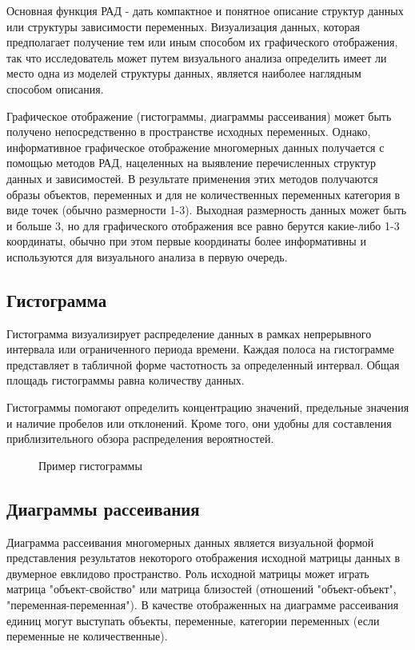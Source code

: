 \documentclass[a4paper, 12pt]{article}
\begin{document}
Основная функция РАД - дать компактное и понятное описание структур данных или структуры зависимости переменных. Визуализация данных, которая предполагает получение тем или иным способом их графического отображения, так что исследователь может путем визуального анализа определить имеет ли место одна из моделей структуры данных, является наиболее наглядным способом описания. 

Графическое отображение (гистограммы, диаграммы рассеивания) может быть получено непосредственно в пространстве исходных переменных. Однако, информативное графическое отображение многомерных данных получается с помощью методов РАД, нацеленных на выявление перечисленных структур данных и зависимостей. В результате применения этих методов получаются образы объектов, переменных и для не количественных переменных категория в виде точек (обычно размерности 1-3). Выходная размерность данных может быть и больше 3, но для графического отображения все равно берутся какие-либо 1-3 координаты, обычно при этом первые координаты более информативны и используются для визуального анализа в первую очередь. 

\subsection{Гистограмма}

Гистограмма визуализирует распределение данных в рамках непрерывного интервала или ограниченного периода времени. Каждая полоса на гистограмме представляет в табличной форме частотность за определенный интервал. Общая площадь гистограммы равна количеству данных.

Гистограммы помогают определить концентрацию значений, предельные значения и наличие пробелов или отклонений. Кроме того, они удобны для составления приблизительного обзора распределения вероятностей.

\begin{figure}[H]
\caption{Пример гистограммы}
\end{figure}

\subsection{Диаграммы рассеивания}

Диаграмма рассеивания многомерных данных является визуальной формой представления результатов некоторого отображения исходной матрицы данных в двумерное евклидово пространство. Роль исходной матрицы может играть матрица "объект-свойство" или матрица близостей (отношений "объект-объект", "переменная-переменная"). В качестве отображенных на диаграмме рассеивания единиц могут выступать объекты, переменные, категории переменных (если переменные не количественные). 
\end{document}
